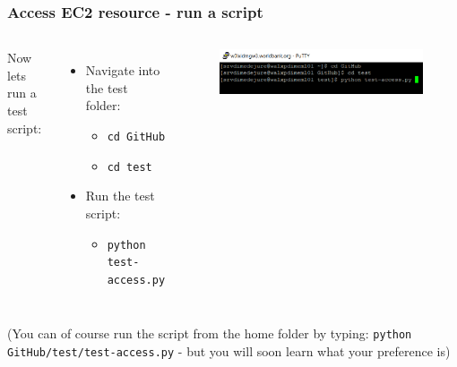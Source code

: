 \documentclass[aspectratio=169]{beamer} %
\begin{document}
\begin{frame}
	\frametitle{Access EC2 resource - run a script}
	\vspace{1cm}
	\begin{columns}[c]
		Now lets run a test script:
		\begin{itemize}
			\item Navigate into the test folder:
			\begin{itemize}
				\item \texttt{cd GitHub}
				\item \texttt{cd test}
			\end{itemize}
			\item Run the test script:
			\begin{itemize}
				\item \texttt{python test-access.py}
			\end{itemize}
		\end{itemize}
		
		\begin{figure}
			\centering
			\includegraphics[width=\textwidth]{./img/access-5.png}
		\end{figure}
		
	\end{columns}
	
	\vspace{1cm}
	\small (You can of course run the script from the home folder by typing: \newline \texttt{python GitHub/test/test-access.py} - but you will soon learn what your preference is)

\end{frame}
\end{document}
